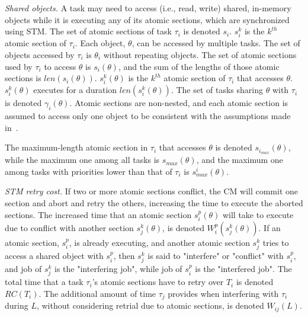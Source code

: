 \documentclass[conference]{sig-alternate}
\begin{document}
\textit{Shared objects.} A task may need to access (i.e., read, write) shared, in-memory objects while it is executing any of its atomic sections, which are synchronized using STM. 
The set of atomic sections of task $\tau_i$ is denoted $s_i$. $s_i^k$ is the $k^{th}$ atomic section of $\tau_i$. 
Each object, $\theta$, can be accessed by multiple tasks. The set of objects accessed by $\tau_i$ is $\theta_i$ without repeating objects.
The set of atomic sections used by $\tau_i$ to access $\theta$ is $s_i(\theta)$, and the sum of the lengths of those atomic sections is $len(s_i(\theta))$. $s_i^k(\theta)$ is the $k^{th}$ atomic section of $\tau_i$ that accesses $\theta$. $s_i^k(\theta)$  executes for a duration $len(s_i^k(\theta))$.
The set of tasks sharing $\theta$ with $\tau_i$ is denoted $\gamma_i(\theta)$. Atomic sections are non-nested, and each atomic section is assumed to access only one object to be consistent with the assumptions made in~\cite{stmconcurrencycontrol:emsoft11}.%

The maximum-length atomic section in $\tau_i$ that accesses $\theta$ is denoted $s_{i_{max}} (\theta)$, while the maximum one among all tasks is $s_{max} (\theta)$, and the maximum one among tasks with priorities lower than that of $\tau_i$ is $s_{max}^i (\theta)$.

\textit{STM retry cost.} If two or more atomic sections conflict, the CM will commit one section and abort and retry the others, increasing the time to execute the aborted sections. The increased time that an atomic section $s_i^p (\theta)$ will take to execute due to conflict with another section $s_j^k (\theta)$, is denoted $W_{i}^{p}(s_{j}^{k}(\theta))$. If an atomic section, $s_i^p$, is already executing, and another atomic section $s_j^k$ tries to access a shared object with $s_i^p$, then $s_j^k$ is said to "interfere" or "conflict" with $s_i^p$, and job of $s_j^k$ is the "interfering job", while job of $s_i^p$ is the "interfered job". The total time that a task $\tau_i$'s atomic sections have to retry over $T_i$ is denoted $RC(T_i)$.
The additional amount of time $\tau_j$ provides when interfering with $\tau_i$ during $L$, without considering retrial due to atomic sections, is denoted $W_{ij}(L)$.
\end{document}
